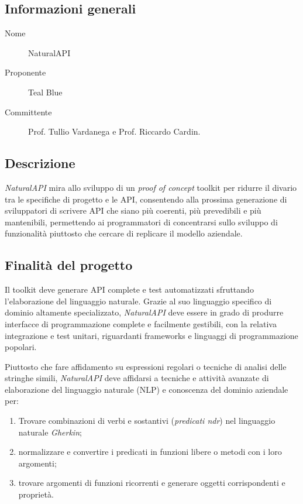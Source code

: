 \documentclass[../studio-di-fattibilita.tex]{subfiles}
\begin{document}
  \subsection{Informazioni generali}
  \label{subsec:informazioni_generali}
  \begin{description}
    \item[Nome] NaturalAPI
    \item[Proponente] Teal Blue
    \item[Committente] Prof. Tullio Vardanega e Prof. Riccardo Cardin.
  \end{description}


  \subsection{Descrizione}
  \label{subsec:descrizione}
  \textit{NaturalAPI} mira allo sviluppo di un \textit{proof of concept} toolkit per ridurre il divario tra le specifiche di progetto e le API, consentendo alla prossima generazione di sviluppatori di scrivere API che siano più coerenti, più prevedibili e più mantenibili, permettendo ai programmatori di concentrarsi sullo sviluppo di funzionalità piuttosto che cercare di replicare il modello aziendale.


  \subsection{Finalità del progetto}
  \label{subsec:finalita_del_progetto}
  Il toolkit deve generare API complete e test automatizzati sfruttando l'elaborazione del linguaggio naturale.
  Grazie al suo linguaggio specifico di dominio altamente specializzato, \textit{NaturalAPI} deve essere in grado di produrre interfacce di programmazione complete e facilmente gestibili, con la relativa integrazione e test unitari, riguardanti frameworks e linguaggi di programmazione popolari.
  
  Piuttosto che fare affidamento su espressioni regolari o tecniche di analisi delle stringhe simili, \textit{NaturalAPI} deve affidarsi a tecniche e attività avanzate di elaborazione del linguaggio naturale (NLP) e conoscenza del dominio aziendale per:
    \begin{enumerate}
      \item Trovare combinazioni di verbi e sostantivi (\textit{predicati ndr}) nel linguaggio naturale \textit{Gherkin};
      \item normalizzare e convertire i predicati in funzioni libere o metodi con i loro argomenti;
      \item trovare argomenti di funzioni ricorrenti e generare oggetti corrispondenti e proprietà.
    \end{enumerate}
\end{document}
